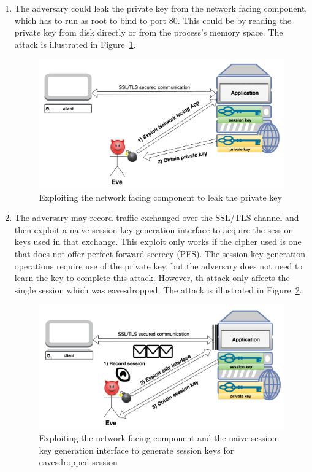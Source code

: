 \documentclass[../main.tex]{subfiles}
\begin{document}
\begin{enumerate}     
	\item The adversary could leak the private key from
	the network facing component, which has to run as root to bind to port 80.
	This could be by reading the private key from disk directly or from the
	process's memory space. The attack is illustrated in
	Figure~\ref{fig:attack1}.

	\begin{figure}[H]
		\centering
		\includegraphics[scale=0.15]{images/attack1.png}
		\caption{Exploiting the network facing component to leak the
		private key}
		\label{fig:attack1} 
	\end{figure}

	\item The adversary may record traffic exchanged over the SSL/TLS channel
	and then exploit a naive session key generation interface to acquire the
	session keys used in that exchange. This exploit only works if the cipher
	used is one that does not offer perfect forward secrecy (PFS). The session
	key generation operations require use of the private key, but the adversary
	does not need to learn the key to complete this attack. However, th attack
	only affects the single session which was eavesdropped. The attack is
	illustrated in Figure~\ref{fig:attack2}.

	\begin{figure}[H]
		\centering
		\includegraphics[scale=0.15]{images/attack2.png}
		\caption{Exploiting the network facing component and the naive 
		session key generation interface to generate session keys for
		eavesdropped session}
		\label{fig:attack2}
	\end{figure}
\end{enumerate}
\end{document}
